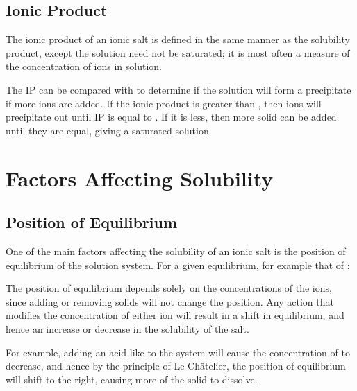 		\subsection{Ionic Product}

			The ionic product of an ionic salt is defined in the same manner as the solubility product, except the solution need not be
			saturated; it is most often a measure of the  concentration of ions in solution.

			The IP can be compared with \Ksp{} to determine if the solution will form a precipitate if more ions are added. If the ionic
			product is greater than \Ksp{}, then ions will precipitate out until IP is equal to \Ksp{}. If it is less, then more solid
			can be added until they are equal, giving a saturated solution.




	\pagebreak
	\section{Factors Affecting Solubility}

		\subsection{Position of Equilibrium}

			One of the main factors affecting the solubility of an ionic salt is the position of equilibrium of the solution system. For a
			given equilibrium, for example that of :


			The position of equilibrium depends solely on the concentrations of the ions, since adding or removing solids will not change the
			position. Any action that modifies the concentration of either ion will result in a shift in equilibrium, and hence an increase or
			decrease in the solubility of the salt.

			For example, adding an acid like  to the system will cause the concentration of  to decrease, and hence by the
			principle of Le Châtelier, the position of equilibrium will shift to the right, causing more of the solid to dissolve.

